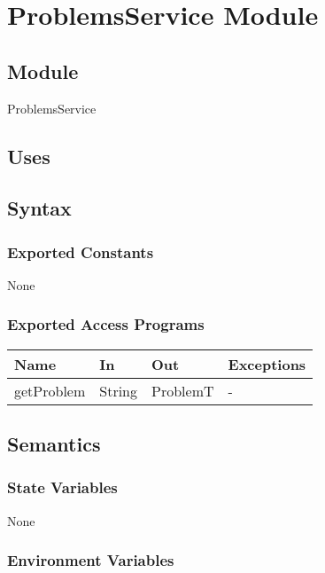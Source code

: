 \documentclass[12pt, titlepage]{article}
\begin{document}
\newpage

\section{ProblemsService Module} \label{ProblemsServiceModule}

\subsection{Module}

ProblemsService

\subsection{Uses}

\subsection{Syntax}

\subsubsection{Exported Constants}

None

\subsubsection{Exported Access Programs}

\begin{center}
\begin{tabular}{p{2cm} p{4cm} p{4cm} p{2cm}}
\hline
\textbf{Name} & \textbf{In} & \textbf{Out} & \textbf{Exceptions} \\
\hline
getProblem & String & ProblemT & - \\
\hline
\end{tabular}
\end{center}

\subsection{Semantics}

\subsubsection{State Variables}

None

\subsubsection{Environment Variables}
\end{document}
